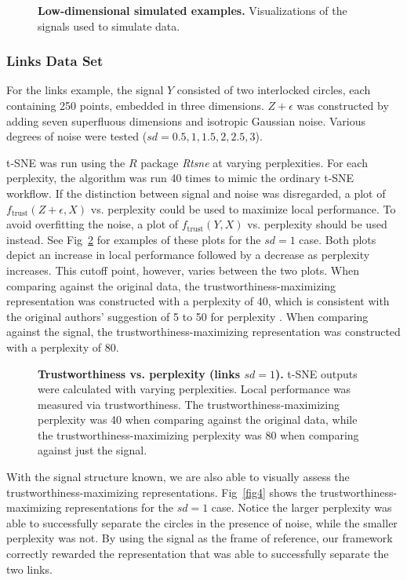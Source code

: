 \documentclass[10pt,letterpaper]{article}
\begin{document}
\begin{figure}[!h]
\caption{{\bf Low-dimensional simulated examples.}
Visualizations of the signals used to simulate data.}
\label{fig2}
\end{figure}

\subsubsection*{Links Data Set}
For the links example, the signal $Y$ consisted of two interlocked circles, each containing 250 points, embedded in three dimensions. $Z + \epsilon$ was constructed by adding seven superfluous dimensions and isotropic Gaussian noise. Various degrees of noise were tested ($sd = 0.5, 1, 1.5, 2, 2.5, 3$).

t-SNE was run using the $R$ package \textit{Rtsne} \cite{Rtsne} at varying perplexities. For each perplexity, the algorithm was run 40 times to mimic the ordinary t-SNE workflow. If the distinction between signal and noise was disregarded, a plot of $f_\textrm{trust}(Z + \epsilon, X)$ vs. perplexity could be used to maximize local performance. To avoid overfitting the noise, a plot of $f_\textrm{trust}(Y, X)$ vs. perplexity should be used instead. See Fig~\ref{fig3} for examples of these plots for the $sd = 1$ case. Both plots depict an increase in local performance followed by a decrease as perplexity increases. This cutoff point, however, varies between the two plots. When comparing against the original data, the trustworthiness-maximizing representation was constructed with a perplexity of 40, which is consistent with the original authors' suggestion of 5 to 50 for perplexity \cite{t-SNE}. When comparing against the signal, the trustworthiness-maximizing representation was constructed with a perplexity of 80.

\begin{figure}[!h]
\caption{{\bf Trustworthiness vs. perplexity (links $sd = 1$).}
t-SNE outputs were calculated with varying perplexities. Local performance was measured via trustworthiness. The trustworthiness-maximizing perplexity was 40 when comparing against the original data, while the trustworthiness-maximizing perplexity was 80 when comparing against just the signal.}
\label{fig3}
\end{figure}

With the signal structure known, we are also able to visually assess the trustworthiness-maximizing representations. Fig~\ref{fig4} shows the trustworthiness-maximizing representations for the $sd = 1$ case. Notice the larger perplexity was able to successfully separate the circles in the presence of noise, while the smaller perplexity was not. By using the signal as the frame of reference, our framework correctly rewarded the representation that was able to successfully separate the two links.
\end{document}
